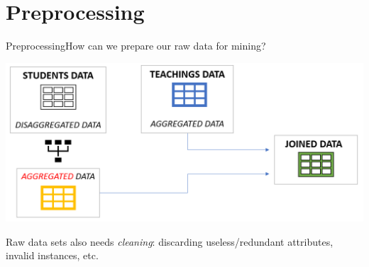 \section{Preprocessing}

\begin{frame}{Preprocessing}{How can we prepare our raw data for mining?}

    \vspace{0.5cm}
    \begin{centering}
        \hspace*{-0.5cm}\includegraphics[scale=0.27]{img5.png}
    \end{centering}

    Raw data sets also needs \emph{cleaning}: discarding useless/redundant attributes, invalid instances, etc.

\end{frame}

